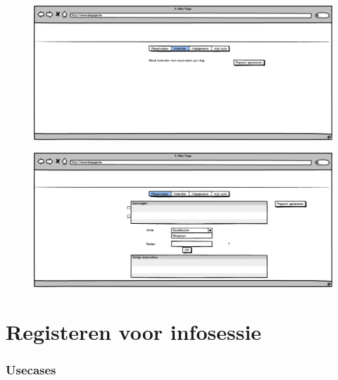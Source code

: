 \documentclass[11pt,a4paper,oneside]{article}
\begin{document}
\begin{center}
\begin{figure}[H]\includegraphics[width=\textwidth]{../../mockups/autobeheer_kalender.png}\end{figure}

\begin{figure}[H]\includegraphics[width=\textwidth]{../../mockups/autobeheer_reservaties.png}\end{figure}

\end{center}

\setcounter{section}{0}
\setcounter{subsection}{0}
\part{Registeren voor infosessie}

\section{Usecases}
\end{document}
